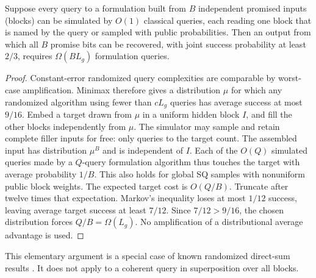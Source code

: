 \begin{lemma}\label{lem:trajectory-direct-sum}
Suppose every query to a formulation built from $B$ independent promised
inputs (blocks) can be simulated by $O(1)$ classical queries, each reading
one block that is named by the query or sampled with public
probabilities.  Then an output from which all
$B$ promise bits can be recovered, with joint success probability at least
$2/3$, requires $\Omega(BL_g)$ formulation queries.
\end{lemma}
\begin{proof}
Constant-error randomized query complexities are comparable by worst-case
amplification.  Minimax therefore gives a distribution $\mu$ for which
any randomized algorithm using fewer than $cL_g$ queries has average
success at most $9/16$.  Embed a target drawn from $\mu$ in a uniform
hidden block $I$, and fill the other blocks independently from $\mu$.
The simulator may sample and retain complete filler inputs for free: only
queries to the target count.  The assembled input has distribution $\mu^B$
and is independent of $I$.  Each of the $O(Q)$ simulated queries made by
a $Q$-query formulation algorithm thus touches the target with average
probability $1/B$.  This also holds for global SQ samples with nonuniform
public block weights.  The expected target cost is $O(Q/B)$.
Truncate after twelve times that expectation.  Markov's inequality loses
at most $1/12$ success, leaving average target success at least $7/12$.
Since $7/12>9/16$, the chosen distribution forces $Q/B=\Omega(L_g)$.
No amplification of a distributional average advantage is used.
\end{proof}

This elementary argument is a special case of known randomized direct-sum
results \citep{BlaisBrody2019}.  It does not apply to a coherent query in
superposition over all blocks.

